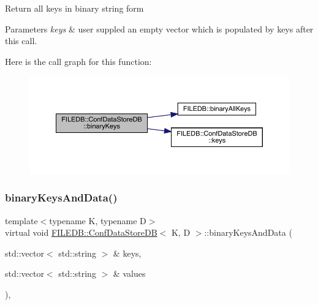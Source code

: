 Return all keys in binary string form 
\begin{DoxyParams}{Parameters}
{\em keys} & user suppled an empty vector which is populated by keys after this call. \\
\hline
\end{DoxyParams}
Here is the call graph for this function\+:
\nopagebreak
\begin{figure}[H]
\begin{center}
\leavevmode
\includegraphics[width=350pt]{d8/d19/classFILEDB_1_1ConfDataStoreDB_a1d0e8e27cd8fc6b24ece52259d1ab2b0_cgraph}
\end{center}
\end{figure}
\mbox{\label{classFILEDB_1_1ConfDataStoreDB_ae38beaf9ba3f8629f2c322a3c5a23357}} 
\subsubsection{\texorpdfstring{binaryKeysAndData()}{binaryKeysAndData()}\hspace{0.1cm}{\footnotesize\ttfamily [1/2]}}
{\footnotesize\ttfamily template$<$typename K, typename D$>$ \\
virtual void \mbox{\hyperlink{classFILEDB_1_1ConfDataStoreDB}{F\+I\+L\+E\+D\+B\+::\+Conf\+Data\+Store\+DB}}$<$ K, D $>$\+::binary\+Keys\+And\+Data (\begin{DoxyParamCaption}\item[{std\+::vector$<$ std\+::string $>$ \&}]{keys,  }\item[{std\+::vector$<$ std\+::string $>$ \&}]{values }\end{DoxyParamCaption})\hspace{0.3cm}{\ttfamily [inline]}, {\ttfamily [virtual]}}

